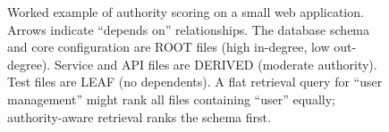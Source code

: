 \begin{figure}[t]
\caption{Worked example of authority scoring on a small web application. Arrows indicate ``depends on'' relationships. The database schema and core configuration are ROOT files (high in-degree, low out-degree). Service and API files are DERIVED (moderate authority). Test files are LEAF (no dependents). A flat retrieval query for ``user management'' might rank all files containing ``user'' equally; authority-aware retrieval ranks the schema first.}
\label{fig:authority-example}
\end{figure}
